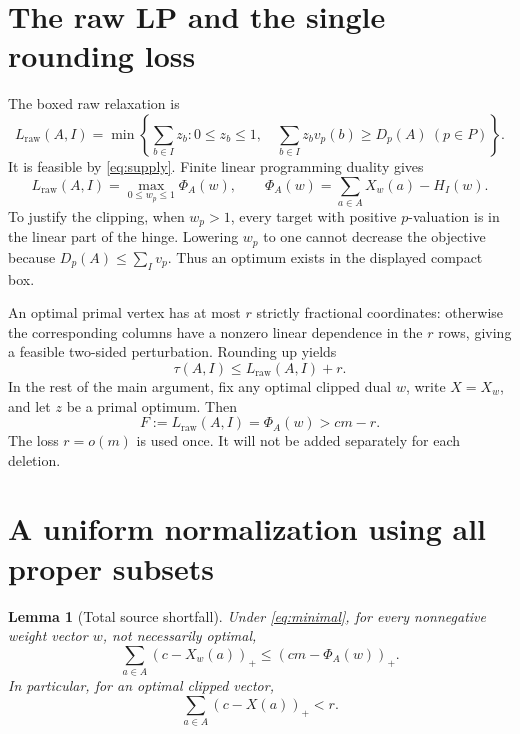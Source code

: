 \documentclass[11pt,a4paper]{article}
\newtheorem{lemma}[theorem]{Lemma}
\theoremstyle{remark}
\newcommand{\pos}[1]{(#1)_+}
\newcommand{\LP}{L_{\mathrm{raw}}}
\begin{document}
\section{The raw LP and the single rounding loss}

The boxed raw relaxation is
\begin{equation}
 \LP(A,I)=\min\left\{\sum_{b\in I}z_b:
 0\le z_b\le1,\quad
 \sum_{b\in I}z_bv_p(b)\ge D_p(A)\ (p\in P)\right\}.
 \label{eq:primal}
\end{equation}
It is feasible by \eqref{eq:supply}. Finite linear programming duality
gives
\begin{equation}
 \LP(A,I)=
 \max_{0\le w_p\le1}\Phi_A(w),\qquad
 \Phi_A(w)=\sum_{a\in A}X_w(a)-H_I(w).
 \label{eq:dual}
\end{equation}
To justify the clipping, when \(w_p>1\), every target with positive
\(p\)-valuation is in the linear part of the hinge. Lowering \(w_p\)
to one cannot decrease the objective because
\(D_p(A)\le\sum_Iv_p\). Thus an optimum exists in the displayed compact
box.

An optimal primal vertex has at most \(r\) strictly fractional
coordinates: otherwise the corresponding columns have a nonzero
linear dependence in the \(r\) rows, giving a feasible two-sided
perturbation. Rounding up yields
\[
 \tau(A,I)\le\LP(A,I)+r.
\]
In the rest of the main argument, fix any optimal clipped dual \(w\),
write \(X=X_w\), and let \(z\) be a primal optimum. Then
\begin{equation}
 F:=\LP(A,I)=\Phi_A(w)>cm-r.
 \label{eq:F-lower}
\end{equation}
The loss \(r=o(m)\) is used once. It will not be added separately for
each deletion.

\section{A uniform normalization using all proper subsets}

\begin{lemma}[Total source shortfall]
\label{lem:shortfall}
Under \eqref{eq:minimal}, for every nonnegative weight vector \(w\),
not necessarily optimal,
\begin{equation}
 \sum_{a\in A}\pos{c-X_w(a)}
 \le\pos{cm-\Phi_A(w)}.
 \label{eq:shortfall}
\end{equation}
In particular, for an optimal clipped vector,
\begin{equation}
 \sum_{a\in A}\pos{c-X(a)}<r.
 \label{eq:optimal-shortfall}
\end{equation}
\end{lemma}
\end{document}
